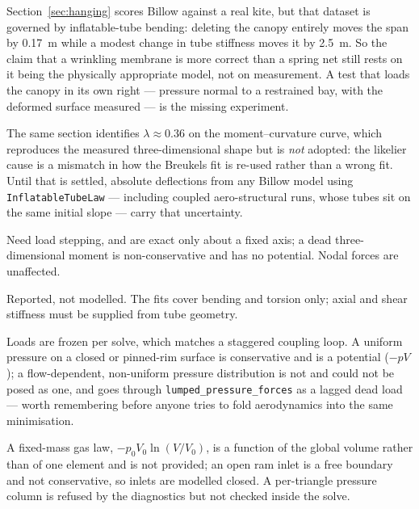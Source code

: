 \documentclass[11pt,a4paper]{article}
\newcommand{\code}[1]{\texttt{\small #1}}
\begin{document}
\begin{description}[style=unboxed,leftmargin=1.2em]
\item[The measured validation cannot decide the canopy.]
Section~\ref{sec:hanging} scores Billow against a real kite, but that dataset
is governed by inflatable-tube bending: deleting the canopy entirely moves the
span by \SI{0.17}{m} while a modest change in tube stiffness moves it by
\SI{2.5}{m}. So the claim that a wrinkling membrane is more correct than a
spring net still rests on it being the physically appropriate model, not on
measurement. A test that loads the canopy in its own right --- pressure normal
to a restrained bay, with the deformed surface measured --- is the missing
experiment.

\item[Tube stiffness is unresolved at roughly a factor of three.] The same
section identifies $\lambda \approx 0.36$ on the moment--curvature curve, which
reproduces the measured three-dimensional shape but is \emph{not} adopted: the
likelier cause is a mismatch in how the Breukels fit is re-used rather than a
wrong fit. Until that is settled, absolute deflections from any Billow model
using \code{InflatableTubeLaw} --- including coupled aero-structural runs, whose
tubes sit on the same initial slope --- carry that uncertainty.

\item[Applied moments.] Need load stepping, and are exact only about a fixed
axis; a dead three-dimensional moment is non-conservative and has no potential.
Nodal forces are unaffected.

\item[Post-collapse tubes.] Reported, not modelled. The fits cover bending and
torsion only; axial and shear stiffness must be supplied from tube geometry.

\item[Dead loads.] Loads are frozen per solve, which matches a staggered
coupling loop. A uniform pressure on a closed or pinned-rim surface is
conservative and is a potential ($-pV$); a flow-dependent, non-uniform pressure
distribution is not and could not be posed as one, and goes through
\code{lumped\_pressure\_forces} as a lagged dead load --- worth remembering
before anyone tries to fold aerodynamics into the same minimisation.

\item[Pressure is prescribed.] A fixed-mass gas law, $-p_0V_0\ln(V/V_0)$, is a
function of the global volume rather than of one element and is not provided;
an open ram inlet is a free boundary and not conservative, so inlets are
modelled closed. A per-triangle pressure column is refused by the diagnostics
but not checked inside the solve.


\end{description}
\end{document}
